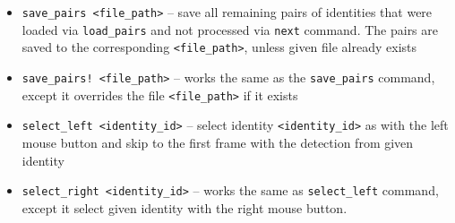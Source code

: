 \begin{itemize}
    \item \verb+save_pairs <file_path>+ -- save all remaining pairs of identities that were loaded via \verb+load_pairs+ and not processed via \verb+next+ command. The
    pairs are saved to the corresponding \verb+<file_path>+, unless given file already
    exists
    \item \verb+save_pairs! <file_path>+ -- works the same as the \verb+save_pairs+
    command, except it overrides the file \verb+<file_path>+ if it exists
    \item \verb+select_left <identity_id>+ -- select identity \verb+<identity_id>+ 
    as with the left mouse button and
    skip to the first frame with the detection from given identity
    \item \verb+select_right <identity_id>+ -- works the same as \verb+select_left+
    command, except it select given identity with the right mouse button.
\end{itemize}

